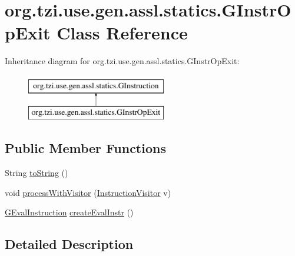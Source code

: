 \hypertarget{classorg_1_1tzi_1_1use_1_1gen_1_1assl_1_1statics_1_1_g_instr_op_exit}{\section{org.\-tzi.\-use.\-gen.\-assl.\-statics.\-G\-Instr\-Op\-Exit Class Reference}
\label{classorg_1_1tzi_1_1use_1_1gen_1_1assl_1_1statics_1_1_g_instr_op_exit}
}
Inheritance diagram for org.\-tzi.\-use.\-gen.\-assl.\-statics.\-G\-Instr\-Op\-Exit\-:\begin{figure}[H]
\begin{center}
\leavevmode
\includegraphics[height=2.000000cm]{classorg_1_1tzi_1_1use_1_1gen_1_1assl_1_1statics_1_1_g_instr_op_exit}
\end{center}
\end{figure}
\subsection*{Public Member Functions}
\begin{DoxyCompactItemize}
\item 
String \hyperlink{classorg_1_1tzi_1_1use_1_1gen_1_1assl_1_1statics_1_1_g_instr_op_exit_a52aad89a6953724480c770d8b5c4c26f}{to\-String} ()
\item 
void \hyperlink{classorg_1_1tzi_1_1use_1_1gen_1_1assl_1_1statics_1_1_g_instr_op_exit_a484029d46156133d6c491e1c817494cf}{process\-With\-Visitor} (\hyperlink{interfaceorg_1_1tzi_1_1use_1_1gen_1_1assl_1_1statics_1_1_instruction_visitor}{Instruction\-Visitor} v)
\item 
\hyperlink{classorg_1_1tzi_1_1use_1_1gen_1_1assl_1_1dynamics_1_1_g_eval_instruction}{G\-Eval\-Instruction} \hyperlink{classorg_1_1tzi_1_1use_1_1gen_1_1assl_1_1statics_1_1_g_instr_op_exit_add46b6a4062789545f629d5a61dc6e3d}{create\-Eval\-Instr} ()
\end{DoxyCompactItemize}


\subsection{Detailed Description}


